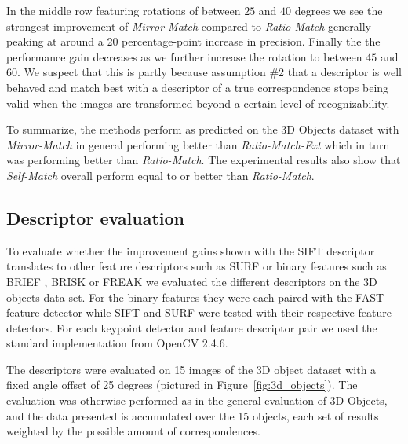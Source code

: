 \documentclass[journal]{IEEEtran}
\begin{document}
In the middle row featuring rotations of between $25$ and $40$ degrees 
we see the strongest improvement of \emph{Mirror-Match} compared to 
\emph{Ratio-Match} generally peaking at around
a 20 percentage-point increase in precision. Finally the the performance
gain decreases as we further increase the rotation to between $45$ and 
$60$. We suspect that this is partly because assumption \#2 that a 
descriptor is well behaved and match best with a descriptor of a true 
correspondence stops being valid when the images are transformed beyond 
a certain level of recognizability.

To summarize, the methods perform as predicted on the 3D Objects dataset
with \emph{Mirror-Match} in general performing better than 
\emph{Ratio-Match-Ext} which in turn was performing better than 
\emph{Ratio-Match}. The experimental results also show that 
\emph{Self-Match} overall perform equal to or better than 
\emph{Ratio-Match}.

\subsection{Descriptor evaluation}
\label{label:desc}

\begin{figure*}[t]
    photos of 3D objects taken 15 degrees apart. K = Keypoint, D = 
Descriptor\.}
    \caption{Keypoint / Descriptor combinations measured on 15 pairs of 
    photos of 3D objects taken 15 degrees apart. K = Keypoint, D = 
Descriptor.}
    \label{fig:descriptors}
\end{figure*}

To evaluate whether the improvement gains shown with the SIFT descriptor 
translates to other feature descriptors such as SURF \cite{bay2006surf} 
or binary features such as BRIEF \cite{calonder2010brief}, BRISK 
\cite{leutenegger2011brisk} or FREAK \cite{alahi2012freak} we evaluated 
the different descriptors on the 3D objects data set.  For the binary 
features they were each paired with the FAST feature detector while SIFT 
and SURF were tested with their respective feature detectors.  For each 
keypoint detector and feature descriptor pair we used the standard 
implementation from OpenCV 2.4.6.

The descriptors were evaluated on 15 images of the 3D object dataset 
with a fixed angle offset of 25 degrees (pictured in 
Figure~\ref{fig:3d_objects}).  The evaluation was otherwise performed as
in the general evaluation of 3D Objects, and the data presented is 
accumulated over the 15 objects, each set of results weighted by the 
possible amount of correspondences.
\end{document}
